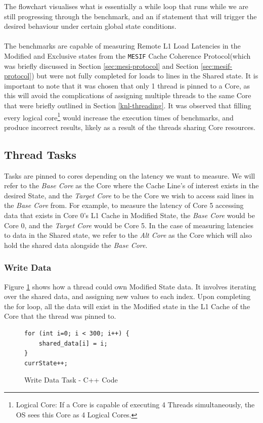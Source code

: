 \documentclass[bsc,frontabs,twoside,singlespacing,parskip,deptreport]{infthesis}     %
\begin{document}
The flowchart visualises what is essentially a while loop that runs while we are still progressing through the benchmark, and an if statement that will trigger the desired behaviour under certain global state conditions. \\
\\
The benchmarks are capable of measuring Remote L1 Load Latencies in the Modified and Exclusive states from the \texttt{MESIF} Cache Coherence Protocol(which was briefly discussed in Section \ref{sec:mesi-protocol} and Section \ref{sec:mesif-protocol}) but were not fully completed for loads to lines in the Shared state. It is  important to note that it was chosen that only 1 thread is pinned to a Core, as this will avoid the complications of assigning multiple threads to the same Core that were briefly outlined in Section \ref{knl-threading}. It was observed that filling every logical core\footnote{Logical Core: If a Core is capable of executing 4 Threads simultaneously, the OS sees this Core as 4 Logical Cores.} would increase the execution times of benchmarks, and produce incorrect results, likely as a result of the threads sharing Core resources.

\subsection{Thread Tasks}
Tasks are pinned to cores depending on the latency we want to measure. We will refer to the \emph{Base Core} as the Core where the Cache Line's of interest exists in the desired State, and the \emph{Target Core} to be the Core we wish to access said lines in the \emph{Base Core} from. For example, to measure the latency of Core 5 accessing data that exists in Core 0's L1 Cache in Modified State, the \emph{Base Core} would be Core 0, and the \emph{Target Core} would be Core 5. In the case of measuring latencies to data in the Shared state, we refer to the \emph{Alt Core} as the Core which will also hold the shared data alongside the \emph{Base Core}.

\subsubsection{Write Data}
Figure \ref{fig:write-data-task-code} shows how a thread could own Modified State data. It involves iterating over the shared data, and assigning new values to each index. Upon completing the for loop, all the data will exist in the Modified state in the L1 Cache of the Core that the thread was pinned to.
\begin{figure}[!h]
    \centering
    \begin{minipage}{0.7\textwidth}
    \begin{verbatim}
for (int i=0; i < 300; i++) {
    shared_data[i] = i;
}
currState++;
    \end{verbatim}
    \end{minipage}
    \caption{Write Data Task - C++ Code}
    \label{fig:write-data-task-code}
\end{figure}
\end{document}

